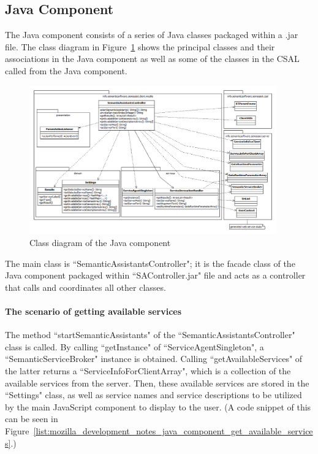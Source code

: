 \subsection{Java Component}
The Java component consists of a series of Java classes packaged within a .jar file. The class diagram in Figure~\ref{fig:mozilla_development_notes_java_component_class_diagram} shows the principal classes and their associations in the Java component as well as some of the classes in the CSAL called from the Java component. 

\begin{figure}[htb]
  \centering
  \includegraphics[width=0.95\textwidth]{pictures/mozilla_development_notes_java_component_class_diagram.png}
  \caption{Class diagram of the Java component}
  \label{fig:mozilla_development_notes_java_component_class_diagram}
\end{figure}

The main class is ``SemanticAssistantsController"; it is the facade class of the Java component packaged within ``SAController.jar" file and acts as a controller that calls and coordinates all other classes. 

\paragraph{The scenario of getting available services} The method ``startSemanticAssistants" of the ``SemanticAssistantsController" class is called. By calling ``getInstance" of ``ServiceAgentSingleton", a ``SemanticServiceBroker" instance is obtained. Calling ``getAvailableServices" of the latter returns a ``ServiceInfoForClientArray", which is a collection of the available services from the server. Then, these available services are stored in the ``Settings" class, as well as service names and service descriptions to be utilized by the main JavaScript component to display to the user. (A code snippet of this can be seen in Figure~\ref{list:mozilla_development_notes_java_component_get_available_services}.)

